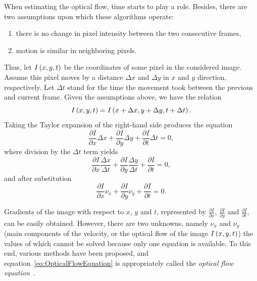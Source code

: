 When estimating the optical flow, time starts to play a role. Besides, there are two assumptions upon which these algorithms operate:
\begin{enumerate}
    \item there is no change in pixel intensity between the two consecutive frames,
    \item motion is similar in neighboring pixels.
\end{enumerate}
Thus, let ${I} \left( x, y, t \right)$ be the coordinates of some pixel in the considered image. Assume this pixel moves by a distance $\Delta x$ and $\Delta y$ in $x$ and $y$ direction, respectively. Let $\Delta t$ stand for the time the movement took between the previous and current frame. Given the assumptions above, we have the relation
\begin{equation}
    {I} \left( x, y, t \right) = {I} \left( x + \Delta x, y + \Delta y, t + \Delta t \right).
\end{equation}
Taking the Taylor expansion of the right-hand side produces the equation
\begin{equation}
    \frac{\partial I}{\partial x} \Delta x +
    \frac{\partial I}{\partial y} \Delta y +
    \frac{\partial I}{\partial t} \Delta t =
    0,
\end{equation}
where division by the $\Delta t$ term yields
\begin{equation}
    \frac{\partial I}{\partial x} \frac{\Delta x}{\Delta t} +
    \frac{\partial I}{\partial y} \frac{\Delta y}{\Delta t} +
    \frac{\partial I}{\partial t} = 0,
\end{equation}
and after substitution
\begin{equation}
    \label{eq:OpticalFlowEquation}
    \frac{\partial I}{\partial x} \nu_x +
    \frac{\partial I}{\partial y} \nu_y +
    \frac{\partial I}{\partial t} =
    0.
\end{equation}

Gradients of the image with respect to $x$, $y$ and $t$, represented by $\frac{\partial I}{\partial x}$, $\frac{\partial I}{\partial y}$ and $\frac{\partial I}{\partial t}$, can be easily obtained. However, there are two unknowns, namely $\nu_x$ and $\nu_y$ (main components of the velocity, or the optical flow of the image ${I} \left( x, y, t \right)$) the values of which cannot be solved because only one equation is available. To this end, various methods have been proposed, and equation~\ref{eq:OpticalFlowEquation} is appropriately called the \emph{optical flow equation}~\cite{fleet2006optical}.
